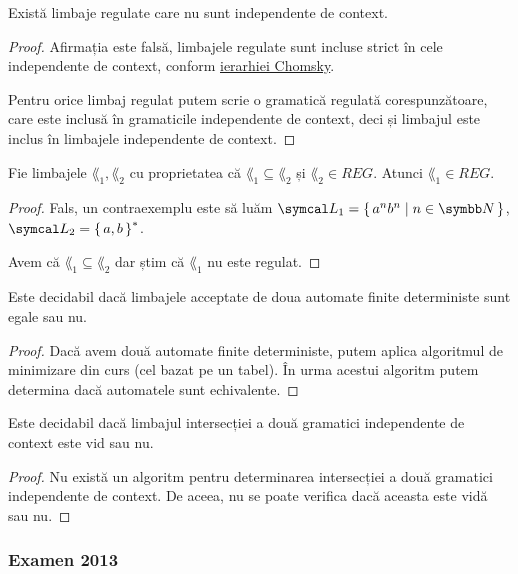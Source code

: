 \begin{exercise}
    Există limbaje regulate care nu sunt independente de context.
\end{exercise}
\begin{proof}
    Afirmația este falsă, limbajele regulate sunt incluse strict în cele independente de context, conform \href{https://en.wikipedia.org/wiki/Chomsky_hierarchy}{ierarhiei Chomsky}.

    Pentru orice limbaj regulat putem scrie o gramatică regulată corespunzătoare, care este inclusă în gramaticile independente de context, deci și limbajul este inclus în limbajele independente de context.
\end{proof}

\begin{exercise}
    Fie limbajele \(\lang_1, \lang_2\) cu proprietatea că  \(\lang_1 \subseteq \lang_2\) și \(\lang_2 \in REG\). Atunci \(\lang_1 \in REG\).
\end{exercise}
\begin{proof}
    Fals, un contraexemplu este să luăm \(\lang_1 = \set{ a^n b^n | n \in \naturals }\), \(\lang_2 = \set{ a, b }^*\).

    Avem că \(\lang_1 \subseteq \lang_2\) dar știm că \(\lang_1\) nu este regulat.
\end{proof}

\begin{exercise}
    Este decidabil dacă limbajele acceptate de doua automate finite deterministe sunt egale sau nu.
\end{exercise}
\begin{proof}
    Dacă avem două automate finite deterministe, putem aplica algoritmul de minimizare din curs (cel bazat pe un tabel). În urma acestui algoritm putem determina dacă automatele sunt echivalente.
\end{proof}

\begin{exercise}
    Este decidabil dacă limbajul intersecției a două gramatici independente de context este vid sau nu.
\end{exercise}
\begin{proof}
    Nu există un algoritm pentru determinarea intersecției a două gramatici independente de context. De aceea, nu se poate verifica dacă aceasta este vidă sau nu.
\end{proof}

\subsubsection*{Examen 2013}

